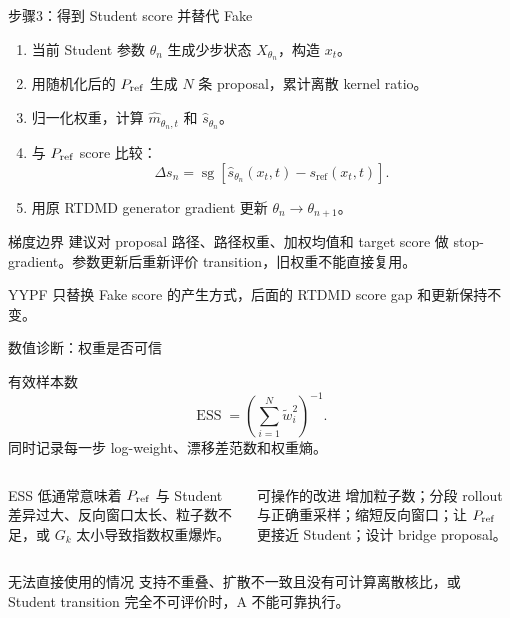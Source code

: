 \documentclass[10pt,aspectratio=169]{beamer}
\newcommand{\ESS}{\operatorname{ESS}}
\begin{document}
\begin{frame}{步骤3：得到 Student score 并替代 Fake}
\begin{enumerate}\itemsep3pt
\item 当前 Student 参数 $\theta_n$ 生成少步状态 $X_{\theta_n}$，构造 $x_t$。
\item 用随机化后的 \ensuremath{P_{\rm ref}} 生成 $N$ 条 proposal，累计离散 kernel ratio。
\item 归一化权重，计算 $\widehat m_{\theta_n,t}$ 和 $\widehat s_{\theta_n}$。
\item 与 \ensuremath{P_{\rm ref}} score 比较：
\begin{equation}
\Delta s_n=\operatorname{sg}\left[\widehat s_{\theta_n}(x_t,t)-s_\mathrm{ref}(x_t,t)\right].
\end{equation}
\item 用原 RTDMD generator gradient 更新 $\theta_n\to\theta_{n+1}$。
\end{enumerate}
\begin{block}{梯度边界}
建议对 proposal 路径、路径权重、加权均值和 target score 做 stop-gradient。参数更新后重新评价 transition，旧权重不能直接复用。
\end{block}
{\small YYPF 只替换 Fake score 的产生方式，后面的 RTDMD score gap 和更新保持不变。}
\end{frame}

\begin{frame}{数值诊断：权重是否可信}
\begin{block}{有效样本数}
\begin{equation}
\ESS=\left(\sum_{i=1}^N\widetilde w_i^2\right)^{-1}.
\end{equation}
同时记录每一步 log-weight、漂移差范数和权重熵。
\end{block}
\begin{columns}[T,onlytextwidth]
\begin{exampleblock}{ESS 低通常意味着}
\ensuremath{P_{\rm ref}} 与 Student 差异过大、反向窗口太长、粒子数不足，或 $G_k$ 太小导致指数权重爆炸。
\end{exampleblock}
\begin{exampleblock}{可操作的改进}
增加粒子数；分段 rollout 与正确重采样；缩短反向窗口；让 \ensuremath{P_{\rm ref}} 更接近 Student；设计 bridge proposal。
\end{exampleblock}
\end{columns}
\begin{alertblock}{无法直接使用的情况}
支持不重叠、扩散不一致且没有可计算离散核比，或 Student transition 完全不可评价时，A 不能可靠执行。
\end{alertblock}
\end{frame}
\end{document}
